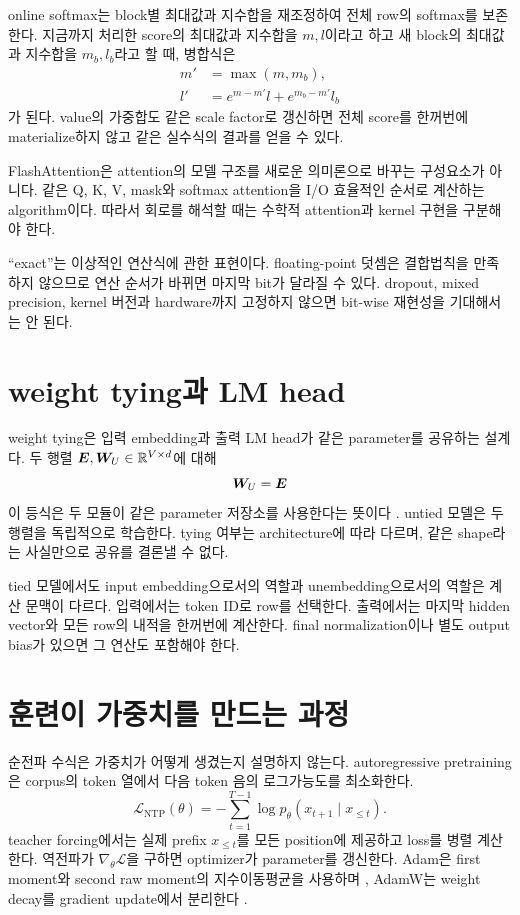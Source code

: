 online softmax는 block별 최대값과 지수합을 재조정하여 전체 row의 softmax를 보존한다.
지금까지 처리한 score의 최대값과 지수합을 $m,l$이라고 하고 새 block의 최대값과 지수합을 $m_b,l_b$라고 할 때, 병합식은
\begin{align}
  m'&=\max(m,m_b),\\
  l'&=e^{m-m'}l+e^{m_b-m'}l_b
\end{align}
가 된다.
value의 가중합도 같은 scale factor로 갱신하면 전체 score를 한꺼번에 materialize하지 않고 같은 실수식의 결과를 얻을 수 있다.

\begin{factbox}
FlashAttention은 attention의 모델 구조를 새로운 의미론으로 바꾸는 구성요소가 아니다.
같은 Q, K, V, mask와 softmax attention을 I/O 효율적인 순서로 계산하는 algorithm이다.
따라서 회로를 해석할 때는 수학적 attention과 kernel 구현을 구분해야 한다.
\end{factbox}

``exact''는 이상적인 연산식에 관한 표현이다.
floating-point 덧셈은 결합법칙을 만족하지 않으므로 연산 순서가 바뀌면 마지막 bit가 달라질 수 있다.
dropout, mixed precision, kernel 버전과 hardware까지 고정하지 않으면 bit-wise 재현성을 기대해서는 안 된다.

\section{weight tying과 LM head}

weight tying은 입력 embedding과 출력 LM head가 같은 parameter를 공유하는 설계다.
두 행렬 $\bm{E},\bm{W}_U\in\mathbb{R}^{V\times d}$에 대해
\begin{equation}
  \bm{W}_U=\bm{E}
\end{equation}
이 등식은 두 모듈이 같은 parameter 저장소를 사용한다는 뜻이다 \citep{press2017tying}.
untied 모델은 두 행렬을 독립적으로 학습한다.
tying 여부는 architecture에 따라 다르며, 같은 shape라는 사실만으로 공유를 결론낼 수 없다.

tied 모델에서도 input embedding으로서의 역할과 unembedding으로서의 역할은 계산 문맥이 다르다.
입력에서는 token ID로 row를 선택한다.
출력에서는 마지막 hidden vector와 모든 row의 내적을 한꺼번에 계산한다.
final normalization이나 별도 output bias가 있으면 그 연산도 포함해야 한다.

\section{훈련이 가중치를 만드는 과정}

순전파 수식은 가중치가 어떻게 생겼는지 설명하지 않는다.
autoregressive pretraining은 corpus의 token 열에서 다음 token 음의 로그가능도를 최소화한다.
\begin{equation}
  \mathcal{L}_{\mathrm{NTP}}(\theta)
  =-\sum_{t=1}^{T-1}\log p_{\theta}(x_{t+1}\mid x_{\le t}).
  \label{eq:next-token-loss}
\end{equation}
teacher forcing에서는 실제 prefix $x_{\le t}$를 모든 position에 제공하고 loss를 병렬 계산한다.
역전파가 $\nabla_{\theta}\mathcal{L}$을 구하면 optimizer가 parameter를 갱신한다.
Adam은 first moment와 second raw moment의 지수이동평균을 사용하며 \citep{kingma2015adam}, AdamW는 weight decay를 gradient update에서 분리한다 \citep{loshchilov2019adamw}.


